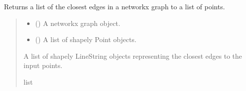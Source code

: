 \documentclass[letterpaper,10pt,english]{sphinxmanual}
\begin{document}

\begin{fulllineitems}
\label{\detokenize{pysewer:pysewer.helper.get_closest_edge_multiple}}
\pysigstartsignatures
{}
\pysigstopsignatures
\sphinxAtStartPar
Returns a list of the closest edges in a networkx graph to a list of points.
\begin{quote}\begin{description}
\begin{itemize}
\item {} 
\sphinxAtStartPar
{} () \textendash{} A networkx graph object.

\item {} 
\sphinxAtStartPar
{} () \textendash{} A list of shapely Point objects.

\end{itemize}

\sphinxAtStartPar
A list of shapely LineString objects representing the closest edges to the input points.

\sphinxAtStartPar
list

\end{description}\end{quote}

\end{fulllineitems}

\end{document}
